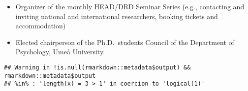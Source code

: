 \documentclass[]{article}
\providecommand{\tightlist}{%
  \setlength{\itemsep}{0pt}\setlength{\parskip}{0pt}}
\begin{document}
\begin{itemize}
\tightlist
\item
  Organizer of the monthly HEAD/DRD Seminar Series (e.g., contacting and
  inviting national and international researchers, booking tickets and
  accommodation)
\item
  Elected chairperson of the Ph.D.~students Council of the Department of
  Psychology, Umeå University.
\end{itemize}

\newpage
\pagestyle{empty}

\begin{verbatim}
## Warning in !is.null(rmarkdown::metadata$output) && rmarkdown::metadata$output
## %in% : 'length(x) = 3 > 1' in coercion to 'logical(1)'
\end{verbatim}
\end{document}
